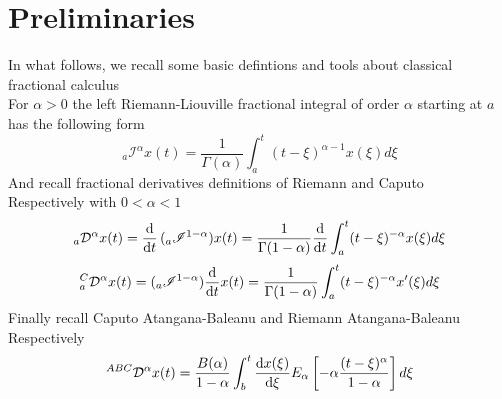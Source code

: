 \documentclass[twoside]{book}
\begin{document}
{\section{Preliminaries}
In what follows, we recall some basic defintions and tools about classical fractional calculus\\
For $\alpha >0$ the left Riemann-Liouville fractional integral of order $\alpha$ starting at $a$ has the following form
\begin{equation}
    \label{Riemannintegral}
    _{a}\mathscr{I}^{\alpha} x(t) = \frac{1}{\Gamma{(\alpha)}} \int_a^{t} (t-\xi)^{\alpha-1} x(\xi) d\xi
\end{equation}
And recall fractional derivatives definitions of Riemann and Caputo \\Respectively with $0<\alpha<1 $
\begin{equation}
    \label{Riem-der}
    _{a}\mathcal{D}^{\alpha} x(t) = \dv{}{t} \, (_{a}\mathscr{I}^{1-\alpha}) x(t) = \frac{1}{\Gamma{(1-\alpha)}}\dv{}{t} \int_a^t (t-\xi)^{-\alpha} x(\xi) d\xi
\end{equation}
\begin{equation}
    \label{Capu-der}
    _{a}^{C}\mathcal{D}^{\alpha} x(t) =  (_{a}\mathscr{I}^{1-\alpha})\dv{}{t} x(t) = \frac{1}{\Gamma{(1-\alpha)}} \int_a^t (t-\xi)^{-\alpha} x'(\xi) d\xi
\end{equation}
Finally recall Caputo Atangana-Baleanu and Riemann Atangana-Baleanu \\ Respectively
\begin{equation}
    \label{atangana derivative C}
    ^{ABC}\mathcal{D}^{\alpha} x(t) = \frac{B(\alpha)}{1-\alpha} \int_b^t \dv{x(\xi)}{\xi} E_{\alpha}\left[ -\alpha \frac{(t-\xi)^\alpha}{1-\alpha} \right] d\xi
\end{equation}

}
\end{document}
